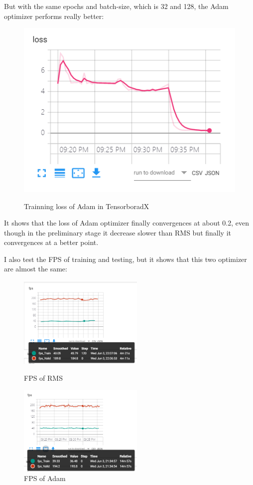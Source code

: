 \documentclass{article}
\begin{document}
But with the same epochs and batch-size, which is 32 and 128, the Adam optimizer performs really better:

\begin{figure}[H]%
  \centering
  \caption{Trainning loss of Adam in TensorboradX}
  \includegraphics[width=40ex]{IMG/loss_Adam.png} %
  \label{Fig.RNN} %
\end{figure}
It shows that the loss of Adam optimizer finally  convergences at about 0.2, even though in the preliminary stage it decrease slower than RMS but finally it convergences at a better point. 

I also test the FPS of training and testing, but it shows that this two optimizer are almost the same:
\begin{figure}[htbp]
\centering
\begin{minipage}[t]{0.48\textwidth}
\centering
\includegraphics[width=6cm]{IMG/RMS_FPS.png}
\caption{FPS of RMS}
\end{minipage}
\begin{minipage}[t]{0.48\textwidth}
\centering
\includegraphics[width=6cm]{IMG/FPS.png}
\caption{FPS of Adam}
\end{minipage}
\end{figure}
\end{document}
